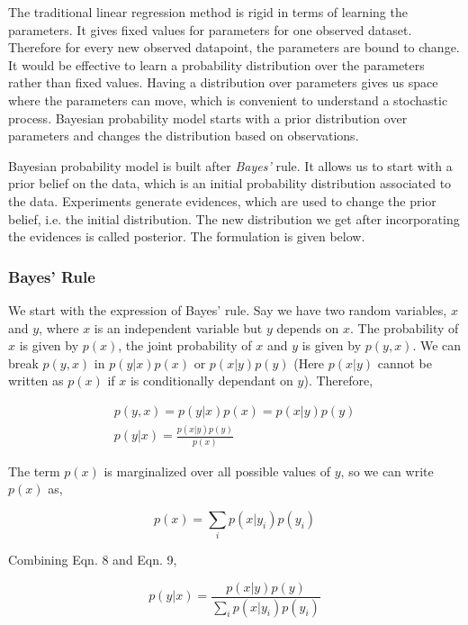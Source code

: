 \documentclass[english]{tktltiki}
\begin{document}
The traditional linear regression method is rigid in terms of learning the parameters. It gives fixed values for parameters for one observed dataset. Therefore for every new observed datapoint, the parameters are bound to change. It would be effective to learn a probability distribution over the parameters rather than fixed values. Having a distribution over parameters gives us space where the parameters can move, which is convenient to understand a stochastic process. Bayesian probability model starts with a prior distribution over parameters and changes the distribution based on observations.

Bayesian probability model is built after \textit{Bayes'} rule. It allows us to start with a prior belief on the data, which is an initial probability distribution associated to the data. Experiments generate evidences, which are used to change the prior belief, i.e. the initial distribution. The new distribution we get after incorporating the evidences is called posterior. The formulation is given below.

\subsubsection{Bayes' Rule}

We start with the expression of Bayes' rule. Say we have two random variables, $x$ and $y$, where $x$ is an independent variable but $y$ depends on $x$. The probability of $x$ is given by $p(x)$, the joint probability of $x$ and $y$ is given by $p(y, x)$. We can break $p(y, x)$ in $p(y|x)p(x)$ or $p(x|y)p(y)$ (Here $p(x|y)$ cannot be written as $p(x)$ if $x$ is conditionally dependant on $y$). Therefore,

\begin{eqnarray}
p(y, x) = p(y|x)p(x) = p(x|y)p(y)\nonumber\\
p(y|x) = \frac{p(x|y)p(y)}{p(x)}
\end{eqnarray}


The term $p(x)$ is marginalized over all possible values of $y$, so we can write $p(x)$ as,

\begin{equation}
p(x) = \sum_i{p(x|y_i)p(y_i)}
\end{equation}


Combining Eqn. 8 and Eqn. 9,

\begin{equation}
p(y|x) = \frac{p(x|y)p(y)}{\sum_i{p(x|y_i)p(y_i)}}
\end{equation}
\end{document}
